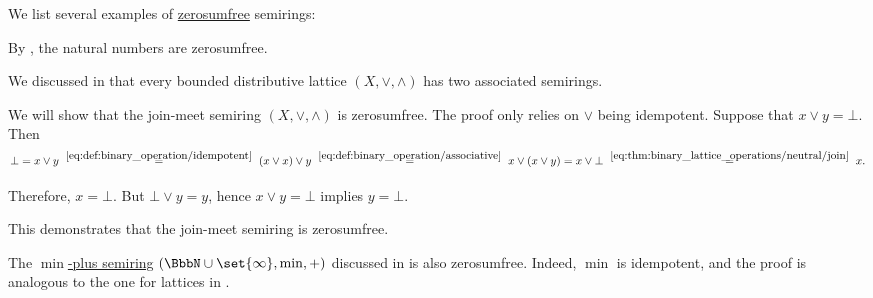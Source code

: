 \begin{example}\label{ex:def:zerosumfree}
  We list several examples of \hyperref[def:zerosumfree]{zerosumfree} semirings:
  \begin{thmenum}
     By , the natural numbers are zerosumfree.

     We discussed in  that every bounded distributive lattice \( (X, \vee, \wedge) \) has two associated semirings.

    We will show that the join-meet semiring \( (X, \vee, \wedge) \) is zerosumfree. The proof only relies on \( \vee \) being idempotent. Suppose that \( x \vee y = \bot \). Then
    \begin{equation*}
      \bot
      =
      x \vee y
      \reloset {\eqref{eq:def:binary_operation/idempotent}} =
      (x \vee x) \vee y
      \reloset {\eqref{eq:def:binary_operation/associative}} =
      x \vee (x \vee y)
      =
      x \vee \bot
      \reloset {\eqref{eq:thm:binary_lattice_operations/neutral/join}} =
      x.
    \end{equation*}

    Therefore, \( x = \bot \). But \( \bot \vee y = y \), hence \( x \vee y = \bot \) implies \( y = \bot \).

    This demonstrates that the join-meet semiring is zerosumfree.

     The \hyperref[def:tropical_semiring]{\( \min \)-plus semiring} \( (\BbbN \cup \set{ \infty }, \min, +) \) discussed in  is also zerosumfree. Indeed, \( \min \) is idempotent, and the proof is analogous to the one for lattices in .
  \end{thmenum}
\end{example}

